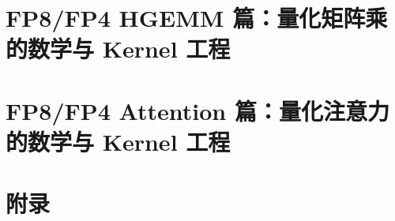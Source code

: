 \documentclass[9pt,openany]{ctexbook}
\begin{document}
\part{FP8/FP4 HGEMM 篇：量化矩阵乘的数学与 Kernel 工程}





\part{FP8/FP4 Attention 篇：量化注意力的数学与 Kernel 工程}








\part{附录}
\appendix






\backmatter
\end{document}
